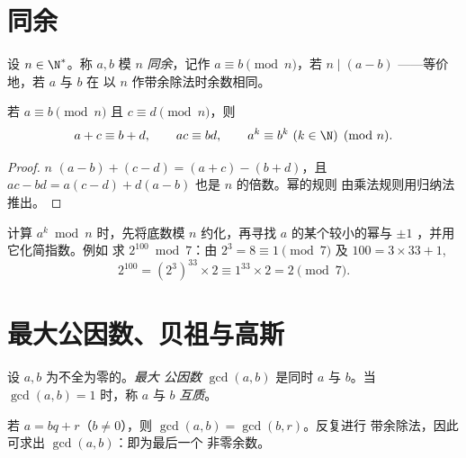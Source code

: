 \section{同余}

\begin{definition}[同余]\label{def:g12:arith:congruence}
设 $n \in \N^*$。称 $a, b$ 模
$n$ \emph{同余}，记作 $a \equiv b \pmod n$，若 $n \mid (a - b)$
——等价地，若 $a$ 与 $b$ 在
以 $n$ 作带余除法时余数相同。
\end{definition}

\begin{proposition}[运算的相容性]\label{prop:g12:arith:congops}
若 $a \equiv b \pmod n$ 且 $c \equiv d \pmod n$，则
\[
a + c \equiv b + d, \qquad
ac \equiv bd, \qquad
a^k \equiv b^k \ (k \in \N) \pmod n .
\]
\end{proposition}

\begin{proof}
$n$  $(a-b) + (c-d) = (a+c) - (b+d)$，且
$ac - bd = a(c - d) + d(a - b)$ 也是 $n$ 的倍数。幂的规则
由乘法规则用归纳法推出。
\end{proof}

\begin{method}[计算模 $n$ 的幂]\label{met:g12:arith:powers}
计算 $a^k \bmod n$ 时，先将底数模 $n$ 约化，再寻找
$a$ 的某个较小的幂与 $\pm1$ ，并用它化简指数。例如
求 $2^{100} \bmod 7$：由 $2^3 = 8 \equiv 1 \pmod 7$ 及
$100 = 3\times33 + 1$,
\[
2^{100} = \left(2^{3}\right)^{33} \times 2 \equiv 1^{33}\times 2 = 2 \pmod 7 .
\]
\end{method}

\section{最大公因数、贝祖与高斯}

\begin{definition}[最大公因数]\label{def:g12:arith:gcd}
设 $a, b$ 为不全为零的。\emph{最大
公因数} $\gcd(a, b)$ 是同时 $a$
与 $b$。当 $\gcd(a,b) = 1$ 时，称 $a$ 与 $b$
\emph{互质}。
\end{definition}

\begin{proposition}[欧几里得算法]\label{prop:g12:arith:euclidalgo}
若 $a = bq + r$（$b \neq 0$），则 $\gcd(a, b) = \gcd(b, r)$。反复进行
带余除法，因此可求出 $\gcd(a,b)$：即为最后一个
非零余数。
\end{proposition}

